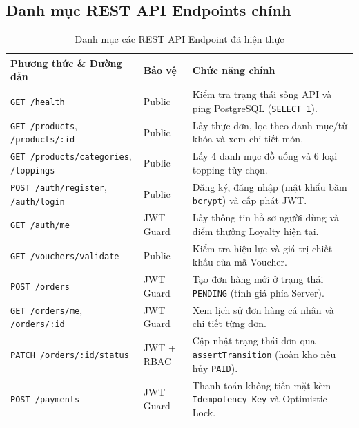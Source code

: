 \documentclass[a4paper,12pt]{article}
\begin{document}
\subsection{Danh mục REST API Endpoints chính}
\begin{table}[h!]
\centering
\scriptsize
\begin{tabularx}{\textwidth}{|l|l|X|}
\hline
\textbf{Phương thức \& Đường dẫn} & \textbf{Bảo vệ} & \textbf{Chức năng chính} \\
\hline
\texttt{GET /health} & Public & Kiểm tra trạng thái sống API và ping PostgreSQL (\texttt{SELECT 1}). \\
\hline
\texttt{GET /products}, \texttt{/products/:id} & Public & Lấy thực đơn, lọc theo danh mục/từ khóa và xem chi tiết món. \\
\hline
\texttt{GET /products/categories}, \texttt{/toppings} & Public & Lấy 4 danh mục đồ uống và 6 loại topping tùy chọn. \\
\hline
\texttt{POST /auth/register}, \texttt{/auth/login} & Public & Đăng ký, đăng nhập (mật khẩu băm \texttt{bcrypt}) và cấp phát JWT. \\
\hline
\texttt{GET /auth/me} & JWT Guard & Lấy thông tin hồ sơ người dùng và điểm thưởng Loyalty hiện tại. \\
\hline
\texttt{GET /vouchers/validate} & Public & Kiểm tra hiệu lực và giá trị chiết khấu của mã Voucher. \\
\hline
\texttt{POST /orders} & JWT Guard & Tạo đơn hàng mới ở trạng thái \texttt{PENDING} (tính giá phía Server). \\
\hline
\texttt{GET /orders/me}, \texttt{/orders/:id} & JWT Guard & Xem lịch sử đơn hàng cá nhân và chi tiết từng đơn. \\
\hline
\texttt{PATCH /orders/:id/status} & JWT + RBAC & Cập nhật trạng thái đơn qua \texttt{assertTransition} (hoàn kho nếu hủy \texttt{PAID}). \\
\hline
\texttt{POST /payments} & JWT Guard & Thanh toán không tiền mặt kèm \texttt{Idempotency-Key} và Optimistic Lock. \\
\hline
\end{tabularx}
\caption{Danh mục các REST API Endpoint đã hiện thực}
\end{table}
\end{document}
